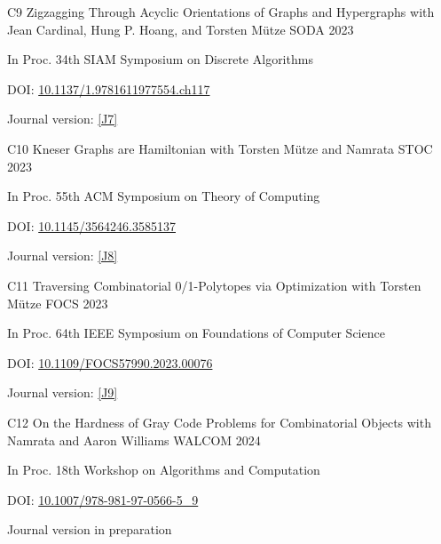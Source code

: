 \begin{cvpublication}
	{C9}
	{Zigzagging Through Acyclic Orientations of Graphs and Hypergraphs}
	{with Jean Cardinal, Hung P. Hoang, and Torsten Mütze}
	{SODA}
	{2023}
    {
	\begin{cvitems}
	\item In Proc. 34th SIAM Symposium on Discrete Algorithms
	\item[] DOI: \href{https://doi.org/10.1137/1.9781611977554.ch117}{10.1137/1.9781611977554.ch117}
	\item Journal version: \hyperlink{paperC7}{[J7]}
	\end{cvitems}
	}
\end{cvpublication}
\begin{cvpublication}
	{C10}
	{Kneser Graphs are Hamiltonian}
	{with Torsten Mütze and Namrata}
	{STOC}
	{2023}
    {
	\begin{cvitems}
	\item In Proc. 55th ACM Symposium on Theory of Computing
	\item[] DOI: \href{https://doi.org/10.1145/3564246.3585137}{10.1145/3564246.3585137}
	\item Journal version: \hyperlink{paperC8}{[J8]}
	\end{cvitems}
	}
\end{cvpublication}
\begin{cvpublication}
	{C11}
	{Traversing Combinatorial 0/1-Polytopes via Optimization}
	{with Torsten Mütze}
	{FOCS}
	{2023}
    {
	\begin{cvitems}
	\item In Proc. 64th IEEE Symposium on Foundations of Computer Science
	\item[] DOI: \href{https://doi.org/10.1109/FOCS57990.2023.00076}{10.1109/FOCS57990.2023.00076}
	\item Journal version: \hyperlink{paperC9}{[J9]}
	\end{cvitems}
	}
\end{cvpublication}
\begin{cvpublication}
	{C12}
	{On the Hardness of Gray Code Problems for Combinatorial Objects}
	{with Namrata and Aaron Williams}
	{WALCOM}
	{2024}
    {
	\begin{cvitems}
	\item In Proc. 18th Workshop on Algorithms and Computation
	\item[] DOI: \href{https://doi.org/10.1007/978-981-97-0566-5\_9}{10.1007/978-981-97-0566-5\_9}
	\item Journal version in preparation
	\end{cvitems}
	}
\end{cvpublication}
